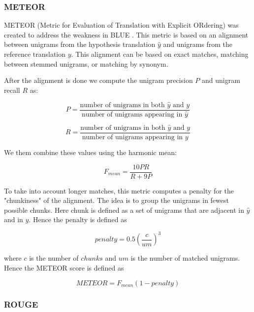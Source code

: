 \subsubsection{METEOR}

METEOR (Metric for Evaluation of Translation with Explicit ORdering) was created to address the weakness in BLUE \cite{Lavie}. This metric is based on an alignment between unigrams from the hypothesis translation $\hat{y}$ and unigrams from the reference translation $y$. This alignment can be based on exact matches, matching between stemmed unigrams, or matching by synonym.

After the alignment is done we compute the unigram precision $P$ and unigram recall $R$ as:

\begin{equation}
P = \frac{\text{number of } \text{unigrams in both } \hat{y} \text{ and } y}{\text{number of } \text{unigrams appearing in } \hat{y}}
\end{equation}    


\begin{equation}
R = \frac{\text{number of } \text{unigrams in both } \hat{y} \text{ and } y}{\text{number of } \text{unigrams appearing in } y}
\end{equation}    

We them combine these values using the harmonic mean:

\begin{equation}
F_{mean} = \frac{10 P R}{R + 9P}
\end{equation}

To take into account longer matches, this metric computes a penalty for the "chunkiness" of the alignment. The idea is to group the unigrams in fewest possible chunks. Here chunk is defined as a set of unigrams that are adjacent in $\hat{y}$ and in $y$. Hence the penalty is defined as

\begin{equation}
penalty = 0.5 \left( \frac{c}{um} \right)^{3}
\end{equation}

where $c$ is the number of $chunks$ and $um$ is the number of matched unigrams. Hence the METEOR score is defined as

\begin{equation}
METEOR = F_{mean} (1 - penalty)
\end{equation}

\subsubsection{ROUGE}

